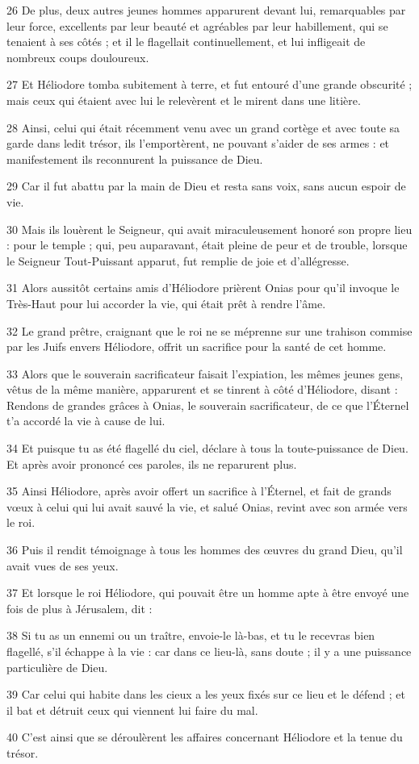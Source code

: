 \par 26 De plus, deux autres jeunes hommes apparurent devant lui, remarquables par leur force, excellents par leur beauté et agréables par leur habillement, qui se tenaient à ses côtés ; et il le flagellait continuellement, et lui infligeait de nombreux coups douloureux.
\par 27 Et Héliodore tomba subitement à terre, et fut entouré d'une grande obscurité ; mais ceux qui étaient avec lui le relevèrent et le mirent dans une litière.
\par 28 Ainsi, celui qui était récemment venu avec un grand cortège et avec toute sa garde dans ledit trésor, ils l'emportèrent, ne pouvant s'aider de ses armes : et manifestement ils reconnurent la puissance de Dieu.
\par 29 Car il fut abattu par la main de Dieu et resta sans voix, sans aucun espoir de vie.
\par 30 Mais ils louèrent le Seigneur, qui avait miraculeusement honoré son propre lieu : pour le temple ; qui, peu auparavant, était pleine de peur et de trouble, lorsque le Seigneur Tout-Puissant apparut, fut remplie de joie et d'allégresse.
\par 31 Alors aussitôt certains amis d'Héliodore prièrent Onias pour qu'il invoque le Très-Haut pour lui accorder la vie, qui était prêt à rendre l'âme.
\par 32 Le grand prêtre, craignant que le roi ne se méprenne sur une trahison commise par les Juifs envers Héliodore, offrit un sacrifice pour la santé de cet homme.
\par 33 Alors que le souverain sacrificateur faisait l'expiation, les mêmes jeunes gens, vêtus de la même manière, apparurent et se tinrent à côté d'Héliodore, disant : Rendons de grandes grâces à Onias, le souverain sacrificateur, de ce que l'Éternel t'a accordé la vie à cause de lui.
\par 34 Et puisque tu as été flagellé du ciel, déclare à tous la toute-puissance de Dieu. Et après avoir prononcé ces paroles, ils ne reparurent plus.
\par 35 Ainsi Héliodore, après avoir offert un sacrifice à l'Éternel, et fait de grands vœux à celui qui lui avait sauvé la vie, et salué Onias, revint avec son armée vers le roi.
\par 36 Puis il rendit témoignage à tous les hommes des œuvres du grand Dieu, qu'il avait vues de ses yeux.
\par 37 Et lorsque le roi Héliodore, qui pouvait être un homme apte à être envoyé une fois de plus à Jérusalem, dit :
\par 38 Si tu as un ennemi ou un traître, envoie-le là-bas, et tu le recevras bien flagellé, s'il échappe à la vie : car dans ce lieu-là, sans doute ; il y a une puissance particulière de Dieu.
\par 39 Car celui qui habite dans les cieux a les yeux fixés sur ce lieu et le défend ; et il bat et détruit ceux qui viennent lui faire du mal.
\par 40 C'est ainsi que se déroulèrent les affaires concernant Héliodore et la tenue du trésor.


